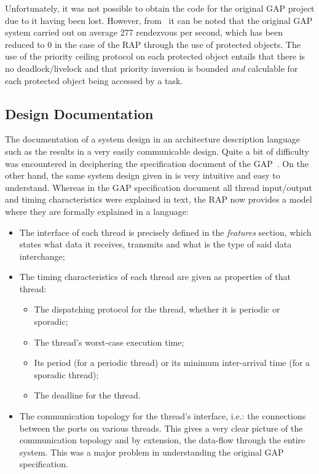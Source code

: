 Unfortunately, it was not possible to obtain the code for the original
GAP project due to it having been lost. However,
from~\cite{locke@rtss91, locke@sei90} it can be noted that the
original GAP system carried out on average 277 rendezvous per second,
which has been reduced to 0 in the case of the RAP through the use of
protected objects. The use of the priority ceiling protocol on each
protected object entails that there is no deadlock/livelock and that
priority inversion is bounded \emph{and} calculable for each protected
object being accessed by a task.

\subsection{Design Documentation}
The documentation of a system design in an architecture description
language such as the \aadl results in a very easily communicable
design. Quite a bit of difficulty was encountered in deciphering the
specification document of the GAP~\cite{locke@sei90}. On the other
hand, the same system design given in \aadl is very intuitive and easy
to understand. Whereas in the GAP specification document all thread
input/output and timing characteristics were explained in text, the
RAP now provides a model where they are formally explained in a
language:

\begin{itemize}
\item
  The interface of each thread is precisely defined in the
  \emph{features} section, which states what data it receives,
  transmits and what is the type of said data interchange;

\item
  The timing characteristics of each thread are given as \aadl
  properties of that thread:
  \begin{itemize}
  \item
    The dispatching protocol for the thread, whether it is periodic or
    sporadic;

  \item
    The thread's worst-case execution time;

  \item
    Its period (for a periodic thread) or its minimum inter-arrival
    time (for a sporadic thread);

  \item
    The deadline for the thread.
  \end{itemize}
  
\item
  The communication topology for the thread's interface, i.e.: the
  connections between the ports on various threads. This gives a very
  clear picture of the communication topology and by extension, the
  data-flow through the entire system. This was a major problem in
  understanding the original GAP specification.
\end{itemize}

